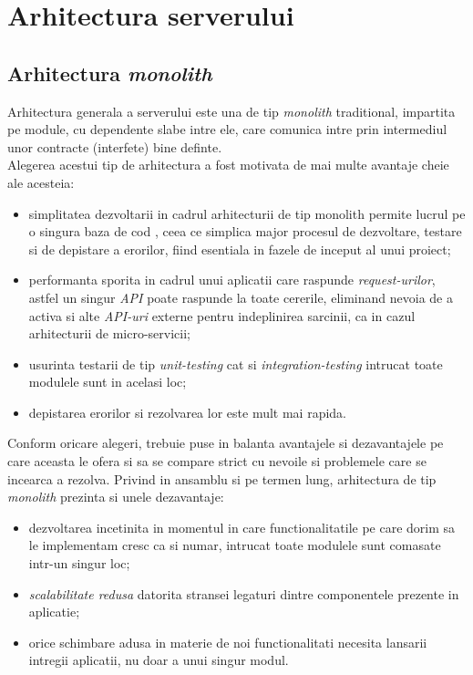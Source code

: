 \section{Arhitectura serverului}

\subsection*{Arhitectura \textit{monolith}}

Arhitectura generala a serverului este una de tip \textit{monolith} traditional, impartita pe module, cu dependente slabe intre ele, care comunica intre prin intermediul unor contracte (interfete) bine definte.\\
Alegerea acestui tip de arhitectura a fost motivata de mai multe avantaje cheie ale acesteia: 
\begin{itemize}
	\item simplitatea dezvoltarii in cadrul arhitecturii de tip monolith permite lucrul pe o singura baza de cod , ceea ce simplica major procesul de dezvoltare, testare si de depistare a erorilor, fiind esentiala in fazele de inceput al unui proiect;
	
	\item  performanta sporita in cadrul unui aplicatii care raspunde \textit{request-urilor}, astfel un singur \textit{API} poate raspunde la toate cererile, eliminand nevoia de a activa si alte \textit{API-uri} externe pentru indeplinirea sarcinii, ca in cazul arhitecturii de micro-servicii;
	
	\item usurinta testarii de tip \textit{unit-testing} cat si \textit{integration-testing} intrucat toate modulele sunt in acelasi loc;
	
	\item  depistarea erorilor si rezolvarea lor este mult mai rapida.
\end{itemize}
Conform oricare alegeri, trebuie puse in balanta avantajele si dezavantajele pe care aceasta le ofera si  sa se compare strict cu nevoile si problemele care se incearca a rezolva. Privind in ansamblu si pe termen lung, arhitectura de tip \textit{monolith} prezinta si unele dezavantaje: 

\begin{itemize}

 \item dezvoltarea incetinita in momentul in care functionalitatile pe care dorim sa le implementam cresc ca si numar, intrucat toate modulele sunt comasate intr-un singur loc;
 
 \item \textit{scalabilitate redusa} datorita stransei legaturi dintre componentele prezente in aplicatie;
 
 \item 	orice schimbare adusa in materie de noi functionalitati necesita lansarii intregii aplicatii, nu doar a unui singur modul.

\end{itemize}

